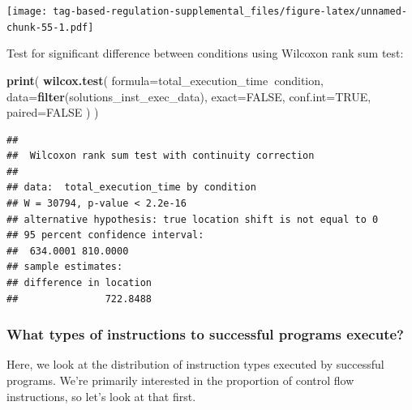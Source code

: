 \documentclass[]{book}
\newenvironment{Shaded}{\begin{snugshade}}{\end{snugshade}}
\newcommand{\DataTypeTok}[1]{\textcolor[rgb]{0.13,0.29,0.53}{#1}}
\newcommand{\KeywordTok}[1]{\textcolor[rgb]{0.13,0.29,0.53}{\textbf{#1}}}
\newcommand{\NormalTok}[1]{#1}
\newcommand{\OperatorTok}[1]{\textcolor[rgb]{0.81,0.36,0.00}{\textbf{#1}}}
\newcommand{\OtherTok}[1]{\textcolor[rgb]{0.56,0.35,0.01}{#1}}
\begin{document}
\texttt{[image: tag-based-regulation-supplemental\_files/figure-latex/unnamed-chunk-55-1.pdf]}

Test for significant difference between conditions using Wilcoxon rank sum test:

\begin{Shaded}
\begin{Highlighting}[]
\KeywordTok{print}\NormalTok{(}
  \KeywordTok{wilcox.test}\NormalTok{(}
    \DataTypeTok{formula=}\NormalTok{total_execution_time}\OperatorTok{~}\NormalTok{condition,}
    \DataTypeTok{data=}\KeywordTok{filter}\NormalTok{(solutions_inst_exec_data),}
    \DataTypeTok{exact=}\OtherTok{FALSE}\NormalTok{,}
    \DataTypeTok{conf.int=}\OtherTok{TRUE}\NormalTok{,}
    \DataTypeTok{paired=}\OtherTok{FALSE}
\NormalTok{  )}
\NormalTok{)}
\end{Highlighting}
\end{Shaded}

\begin{verbatim}
## 
##  Wilcoxon rank sum test with continuity correction
## 
## data:  total_execution_time by condition
## W = 30794, p-value < 2.2e-16
## alternative hypothesis: true location shift is not equal to 0
## 95 percent confidence interval:
##  634.0001 810.0000
## sample estimates:
## difference in location 
##               722.8488
\end{verbatim}

\hypertarget{what-types-of-instructions-to-successful-programs-execute}{%
\subsubsection{What types of instructions to successful programs execute?}\label{what-types-of-instructions-to-successful-programs-execute}}

Here, we look at the distribution of instruction types executed by successful programs.
We're primarily interested in the proportion of control flow instructions, so let's look at that first.
\end{document}
